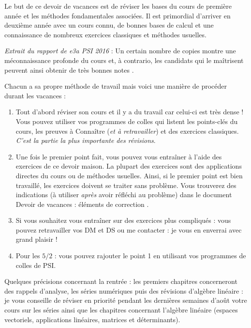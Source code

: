 \documentclass[a4paper,twoside,french,11pt]{VcCours}
\begin{document}

Le but de ce devoir de vacances est de réviser les bases du cours de première année et les méthodes fondamentales associées. Il est primordial d'arriver en deuxième année avec un cours connu, de bonnes bases de calcul et une connaissance de nombreux exercices classiques et méthodes usuelles.

\textit{Extrait du rapport de e3a PSI 2016} : \og Un certain nombre de copies montre une méconnaissance profonde du cours et, à contrario, les candidats qui le maîtrisent peuvent ainsi obtenir de très bonnes notes \fg .

Chacun a sa propre méthode de travail mais voici une manière de procéder durant les vacances :

\begin{enumerate}
\item Tout d'abord réviser son cours et il y a du travail car celui-ci est très dense ! Vous pouvez utiliser vos programmes de colles qui listent les points-clés du cours, les preuves à Connaître (\textit{et à retravailler}) et des exercices classiques. \textit{C'est la partie la plus importante des révisions}.
\item Une fois le premier point fait, vous pouvez vous entraîner à l'aide des exercices de ce devoir maison. La plupart des exercices sont des applications directes du cours ou de méthodes usuelles. Ainsi, si le premier point est bien travaillé, les exercices doivent se traiter sans problème. Vous trouverez des indications (à utiliser \textit{après} avoir réfléchi au problème) dans le document \og Devoir de vacances : éléments de correction \fg .
\item Si vous souhaitez vous entraîner sur des exercices plus compliqués : vous pouvez retravailler vos DM et DS ou me contacter : je vous en enverrai avec grand plaisir !
\item Pour les $5/2$ : vous pouvez rajouter le point 1 en utilisant vos programmes de colles de PSI.
\end{enumerate}

Quelques précisions concernant la rentrée : les premiers chapitres concerneront des rappels d'analyse, les séries numériques puis des révisions d'algèbre linéaire : je vous conseille de réviser en priorité pendant les dernières semaines d'août votre cours sur les séries ainsi que les chapitres concernant l'algèbre linéaire (espaces vectoriels, applications linéaires, matrices et déterminants).
\end{document}
